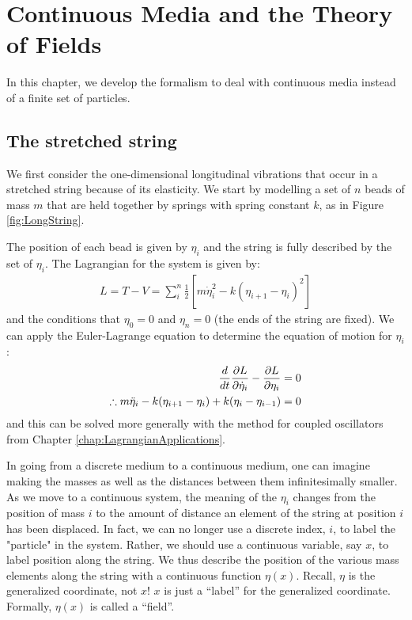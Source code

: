 %
\chapter{Continuous Media and the Theory of Fields}
In this chapter, we develop the formalism to deal with continuous media instead of a finite set of particles. 

\section{The stretched string}
We first consider the one-dimensional longitudinal vibrations that occur in a stretched string because of its elasticity. We start by modelling a set of $n$ beads of mass $m$ that are held together by springs with spring constant $k$, as in Figure \ref{fig:LongString}.

The position of each bead is given by $\eta_i$ and the string is fully described by the set of $\eta_i$. The Lagrangian for the system is given by:
\begin{align}
L=T-V=\sum_i^n \frac{1}{2}\left[m\dot\eta_i^2-k(\eta_{i+1}-\eta_i)^2\right]
\end{align}
and the conditions that $\eta_0=0$ and $\eta_n=0$ (the ends of the string are fixed). We can apply the Euler-Lagrange equation to determine the equation of motion for $\eta_i$:
\begin{align}
\frac{d}{dt}\frac{\partial L}{\partial \dot\eta_i}-\frac{\partial L}{\partial \eta_i}&=0\nonumber\\
\therefore m\ddot\eta_i-k(\eta_{i+1}-\eta_i)+k(\eta_i-\eta_{i-1})&=0
\end{align}
and this can be solved more generally with the method for coupled oscillators from Chapter \ref{chap:LagrangianApplications}.

In going from a discrete medium to a continuous medium, one can imagine making the masses as well as the distances between them infinitesimally smaller. As we move to a continuous system, the meaning of the $\eta_i$ changes from the position of mass $i$ to the amount of distance an element of the string at position $i$ has been displaced. In fact, we can no longer use a discrete index, $i$, to label the "particle" in the system. Rather, we should use a continuous variable, say $x$, to label position along the string. We thus describe the position of the various mass elements along the string with a continuous function $\eta(x)$. Recall, $\eta$ is the generalized coordinate, not $x$! $x$ is just a ``label'' for the generalized coordinate. Formally, $\eta(x)$ is called a ``field''.

